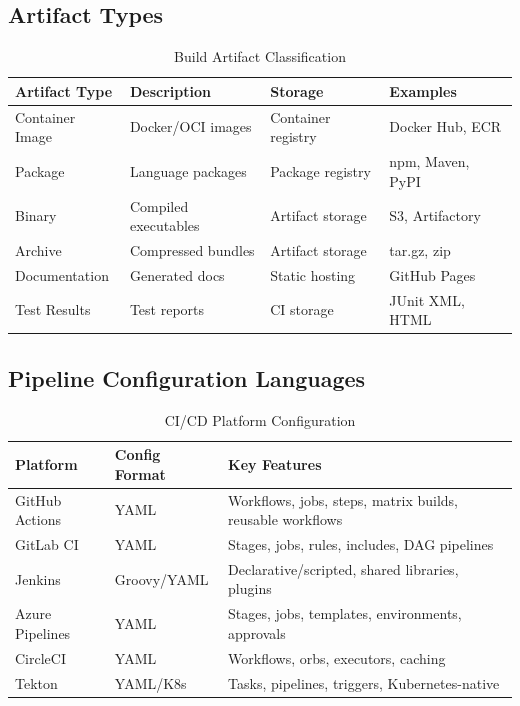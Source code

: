 \documentclass[11pt,letterpaper]{article}
\begin{document}
\subsection{Artifact Types}

\begin{table}[H]
\centering
\caption{Build Artifact Classification}
\small
\begin{tabular}{@{}L{2.5cm}L{3.5cm}L{3cm}L{3cm}@{}}
\toprule
\textbf{Artifact Type} & \textbf{Description} & \textbf{Storage} & \textbf{Examples} \\
\midrule
Container Image & Docker/OCI images & Container registry & Docker Hub, ECR \\
\addlinespace
Package & Language packages & Package registry & npm, Maven, PyPI \\
\addlinespace
Binary & Compiled executables & Artifact storage & S3, Artifactory \\
\addlinespace
Archive & Compressed bundles & Artifact storage & tar.gz, zip \\
\addlinespace
Documentation & Generated docs & Static hosting & GitHub Pages \\
\addlinespace
Test Results & Test reports & CI storage & JUnit XML, HTML \\
\bottomrule
\end{tabular}
\end{table}

\subsection{Pipeline Configuration Languages}

\begin{table}[H]
\centering
\caption{CI/CD Platform Configuration}
\small
\begin{tabular}{@{}L{2.5cm}L{2.5cm}L{7.5cm}@{}}
\toprule
\textbf{Platform} & \textbf{Config Format} & \textbf{Key Features} \\
\midrule
GitHub Actions & YAML & Workflows, jobs, steps, matrix builds, reusable workflows \\
\addlinespace
GitLab CI & YAML & Stages, jobs, rules, includes, DAG pipelines \\
\addlinespace
Jenkins & Groovy/YAML & Declarative/scripted, shared libraries, plugins \\
\addlinespace
Azure Pipelines & YAML & Stages, jobs, templates, environments, approvals \\
\addlinespace
CircleCI & YAML & Workflows, orbs, executors, caching \\
\addlinespace
Tekton & YAML/K8s & Tasks, pipelines, triggers, Kubernetes-native \\
\bottomrule
\end{tabular}
\end{table}
\end{document}
